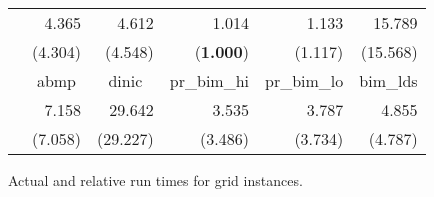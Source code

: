 \documentclass{article}
\begin{document}
\begin{figure}[ht]
\begin{center}
\begin{scriptsize}
\begin{tabular}{||c|r|r|r|r|r||}
    &   4.365   &   4.612   &   1.014   &   1.133   &   15.789  \\
    &   (4.304) &   (4.548) &   ({\bf 1.000})   &   (1.117) &   (15.568)    \\  \cline{2-6}
    &   \multicolumn{1}{|c|}{{\sf abmp}}    &   \multicolumn{1}{|c|}{{\sf dinic}}   &   \multicolumn{1}{|c|}{{\sf pr\_bim\_hi}} &   \multicolumn{1}{|c|}{{\sf pr\_bim\_lo}} &   \multicolumn{1}{|c||}{{\sf bim\_lds}}   \\  \cline{2-6}
    &   7.158   &   29.642  &   3.535   &   3.787   &   4.855   \\
    &   (7.058) &   (29.227)    &   (3.486) &   (3.734) &   (4.787) \\  \hline
\hline
\end{tabular}
\end{scriptsize}
\caption{\label{Figure:gridscaling} Actual and relative run times for {\sf grid} instances.}
\end{center}
\end{figure}
\end{document}
